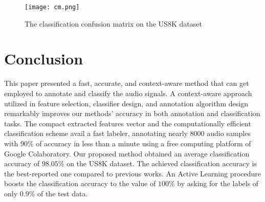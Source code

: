 \documentclass{article}
\begin{document}
\begin{figure}	
	\centering	
	\texttt{[image: cm.png]}  
	\caption{The classification confusion matrix on the US8K dataset}
	\label{fig: cm}
\end{figure}

\section{Conclusion}
\label{conclusion}
This paper presented a fast, accurate, and context-aware method that can get employed to annotate and classify the audio signals. A context-aware approach utilized in feature selection, classifier design, and annotation algorithm design remarkably improves our methods' accuracy in both annotation and classification tasks. The compact extracted features vector and the computationally efficient classification scheme avail a fast labeler, annotating nearly $8000$ audio samples with $90\%$ of accuracy in less than a minute using a free computing platform of Google Colaboratory. Our proposed method obtained an average classification accuracy of $98.05\%$ on the US8K dataset. The achieved classification accuracy is the best-reported one compared to previous works. An Active Learning procedure boosts the classification accuracy to the value of $100\%$ by asking for the labels of only $0.9\%$ of the test data.


  
\end{document}
